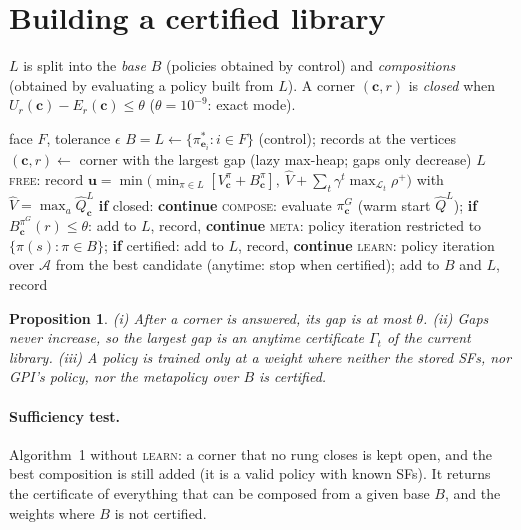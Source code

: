 \documentclass[11pt]{article}
\newcommand{\cA}{\mathcal A}
\newcommand{\cL}{\mathcal L}
\newtheorem{proposition}{Proposition}
\theoremstyle{definition}
\begin{document}
\section{Building a certified library}

$L$ is split into the \emph{base} $B$ (policies obtained by control) and \emph{compositions} (obtained by evaluating a
policy built from $L$). A corner $(\mathbf c,r)$ is \emph{closed} when $U_r(\mathbf c)-E_r(\mathbf c)\le\theta$
($\theta=10^{-9}$: exact mode).

\begin{algorithm}[H]
\caption{Certified library (CL)}
\begin{algorithmic}[1]
\Require face $F$, tolerance $\epsilon$
\State $B=L\gets\{\pi^*_{\mathbf e_i}:i\in F\}$ (control); records at the vertices
\Loop
  \State $(\mathbf c,r)\gets$ corner with the largest gap (lazy max-heap; gaps only decrease)
   \Return $L$ \Comment{$\Gamma\le\epsilon$} \EndIf
  \State \textsc{free}: record $\mathbf u=\min\big(\min_{\pi\in L}[V^\pi_{\mathbf c}+B^\pi_{\mathbf c}],\ \hat V+\textstyle\sum_t\gamma^t\max_{\cL_t}\rho^+\big)$ with
  $\hat V=\max_a\hat Q^L_{\mathbf c}$ 
  \State \textbf{if} closed: \textbf{continue}
  \State \textsc{compose}: evaluate $\pi^G_{\mathbf c}$ (warm start $\hat Q^L$); \textbf{if} $B^{\pi^G}_{\mathbf c}(r)\le\theta$: add to $L$, record, \textbf{continue}
  \State \textsc{meta}: policy iteration restricted to $\{\pi(s):\pi\in B\}$; \textbf{if} certified: add to $L$, record, \textbf{continue}
  \State \textsc{learn}: policy iteration over $\cA$ from the best candidate (anytime: stop when certified); add to $B$ and $L$, record
\EndLoop
\end{algorithmic}
\end{algorithm}

\begin{proposition}
(i) After a corner is answered, its gap is at most $\theta$. (ii) Gaps never increase, so the largest gap is an
anytime certificate $\Gamma_t$ of the current library. (iii) A policy is trained only at a weight where neither the
stored SFs, nor GPI's policy, nor the metapolicy over $B$ is certified.
\end{proposition}

\paragraph{Sufficiency test.} Algorithm~1 without \textsc{learn}: a corner that no rung closes is kept open, and the
best composition is still added (it is a valid policy with known SFs). It returns the certificate of everything that
can be composed from a given base $B$, and the weights where $B$ is not certified.
\end{document}
